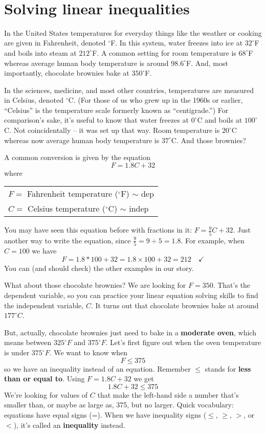 ~\vspace{.1in}

\section{Solving linear inequalities }

In the United States temperatures for everyday things like the weather or cooking are given in Fahrenheit, denoted $^\circ$F.  In this system, water freezes into ice at $32^\circ$F and boils into steam at $212^\circ$F.  A common setting for room temperature is $68^\circ$F whereas average human body temperature is around $98.6^\circ$F.  And, most importantly, chocolate brownies bake at $350^\circ$F.

In the sciences, medicine, and most other countries, temperatures are measured in Celsius, denoted $^\circ$C.  (For those of us who grew up in the 1960s or earlier, ``Celsius'' is the temperature scale formerly known as ``centigrade.'') 
For comparison's sake, it's useful to know that water freezes at $0^\circ$C and boils at $100^\circ$C.  Not coincidentally -- it was set up that way.  Room temperature is $20^\circ$C whereas now average human body temperature is $37^\circ$C.  And those brownies? 
 
A common conversion is given by the equation $$F = 1.8C+32$$ 
where 
\begin{center}
\begin{tabular} {l} 
$F=$ Fahrenheit temperature ($^\circ$F) $\sim$ dep \\
$C=$ Celsius temperature ($^\circ$C) $\sim$ indep \\ 
\end{tabular}
\end{center}
You may have seen this equation before with fractions in it:  $F = \frac{9}{5}C + 32$.  Just another way to write the equation, since $\frac{9}{5} = 9 \div 5 = 1.8$.  
For example, when $C=100$ we have $$F= 1.8 \ast 100 + 32 =1.8 \times \underline{100}+32= 212 \quad \checkmark$$   You can (and should check) the other examples in our story.
 
What about those chocolate brownies?  
We are looking for $F=350$.  That's the dependent variable, so you can practice your  linear equation solving skills to find the independent variable, $C$.  It turns out that chocolate brownies bake at around $177^\circ C$.

But, actually, chocolate brownies just need to bake in a \textbf{moderate oven}, which means between $325^\circ F$ and $375^\circ F$.  Let's first figure out when the oven temperature is under $375^\circ F$.  We want to know when $$F \le 375$$
so we have an inequality instead of an equation. Remember $\le$ stands for \textbf{less than or equal to}. Using  $F=1.8C+32$ we get $$1.8C+32 \le 375$$  We're looking for values of $C$ that make the left-hand side a number that's smaller than, or maybe as large as, 375, but no larger.  Quick vocabulary:  equations have equal signs (=).  When we have inequality signs ($\le$, $\ge$, $>$, or $<$), it's called an \textbf{inequality} instead.

